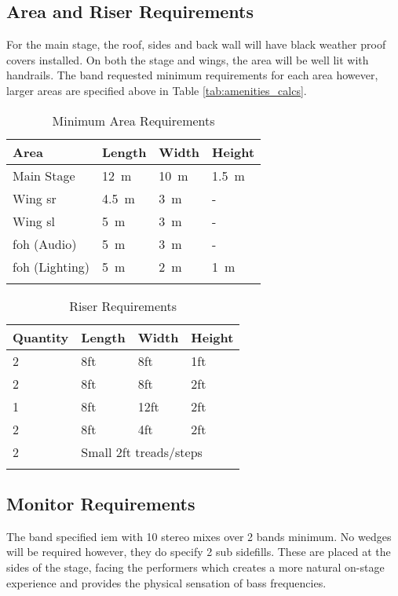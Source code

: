     \subsection{Area and Riser Requirements}
    For the main stage, the roof, sides and back wall will have black weather proof covers installed. On both the stage and wings, the area will be well lit with handrails. The band requested minimum requirements for each area however, larger areas are specified above in Table \ref{tab:amenities_calcs}.

    \begin{longtable}[H]{|l|l|l|l|}
        \hline
        \textbf{Area} & \textbf{Length} & \textbf{Width} & \textbf{Height} \\ \hline
        \endfirsthead
        \endhead
        Main Stage & \SI{12}{\metre} & \SI{10}{\metre} & \SI{1.5}{\metre} \\ \hline
        Wing \acrshort{sr} & \SI{4.5}{\metre} & \SI{3}{\metre} & - \\ \hline
        Wing \acrshort{sl} & \SI{5}{\metre} & \SI{3}{\metre} & - \\ \hline
        \acrshort{foh} (Audio) & \SI{5}{\metre} & \SI{3}{\metre} & - \\ \hline
        \acrshort{foh} (Lighting) & \SI{5}{\metre} & \SI{2}{\metre} & \SI{1}{\metre} \\ \hline
        \caption{Minimum Area Requirements}
        \label{tab:area_requirements}
    \end{longtable}

    \begin{longtable}[H]{|l|lll|}
        \hline
        \textbf{Quantity} & \multicolumn{1}{l|}{\textbf{Length}} & \multicolumn{1}{l|}{\textbf{Width}} & \textbf{Height} \\ \hline
        \endfirsthead
        \endhead
        2 & \multicolumn{1}{l|}{8ft} & \multicolumn{1}{l|}{8ft} & 1ft \\ \hline
        2 & \multicolumn{1}{l|}{8ft} & \multicolumn{1}{l|}{8ft} & 2ft \\ \hline
        1 & \multicolumn{1}{l|}{8ft} & \multicolumn{1}{l|}{12ft} & 2ft \\ \hline
        2 & \multicolumn{1}{l|}{8ft} & \multicolumn{1}{l|}{4ft} & 2ft \\ \hline
        2 & \multicolumn{3}{l|}{Small 2ft treads/steps} \\ \hline
        \caption{Riser Requirements}
        \label{tab:riser_requirements}
    \end{longtable}

    \subsection{Monitor Requirements}
    The band specified \acrfull{iem} with 10 stereo mixes over 2 bands minimum. No wedges will be required however, they do specify 2 sub sidefills. These are placed at the sides of the stage, facing the performers which creates a more natural on-stage experience and provides the physical sensation of bass frequencies.